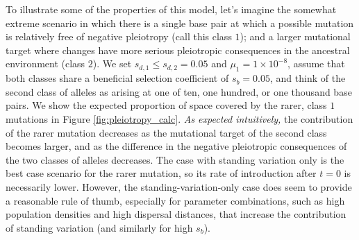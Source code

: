 \documentclass{article}
\newcommand{\mfp}[1]{{\it\color{red}#1}}
\begin{document}
To illustrate some of the properties of this model, 
let's imagine the somewhat extreme scenario in which there is a single base pair 
at which a possible mutation is relatively free of negative pleiotropy (call this class $1$);
and a larger mutational target where changes 
have more serious pleiotropic consequences in the ancestral environment (class $2$). 
We set $s_{d,1} \leq s_{d,2}=0.05$ and $\mu_1=1 \times 10^{-8}$, 
assume that both classes share a beneficial selection coefficient of $s_b=0.05$,
and think of the second class of alleles as arising at one of ten, one hundred, or one thousand base pairs. 
We show the expected proportion of space covered by
the rarer, class $1$ mutations in Figure \ref{fig:pleiotropy_calc}.
\mfp{As expected intuitively,} the contribution of the rarer mutation decreases as the
mutational target of the second class becomes larger, and as the
difference in the negative pleiotropic consequences of the two classes of alleles decreases. 
The case with standing variation only is the best case scenario 
for the rarer mutation, so its rate of introduction after $t=0$ is necessarily lower. 
However, the standing-variation-only case does seem to provide a
reasonable rule of thumb, especially for parameter combinations, 
such as high population densities and high dispersal distances, 
that increase the contribution of standing variation (and similarly for high $s_b$). 
\end{document}
